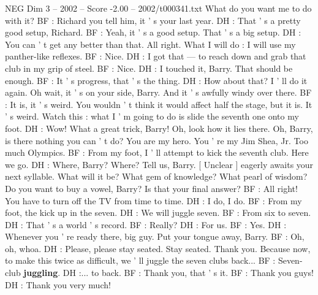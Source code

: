 \begin{textsample}{NEG Dim 3 – 2002 – Score -2.00 – 2002/t000341.txt}
What do you want me to do with it?
BF : Richard you tell him, it ' s your last year.
DH : That ' s a pretty good setup, Richard.
BF : Yeah, it ' s a good setup.
That ' s a big setup.
DH : You can ' t get any better than that.
All right.
What I will do : I will use my panther-like reflexes.
BF : Nice.
DH : I got that — to reach down and grab that club in my grip of steel.
BF : Nice.
DH : I touched it, Barry.
That should be enough.
BF : It ' s progress, that ' s the thing.
DH : How about that?
I ' ll do it again.
Oh wait, it ' s on your side, Barry.
And it ' s awfully windy over there.
BF : It is, it ' s weird.
You wouldn ' t think it would affect half the stage, but it is.
It ' s weird.
Watch this : what I ' m going to do is slide the seventh one onto my foot.
DH : Wow!
What a great trick, Barry!
Oh, look how it lies there.
Oh, Barry, is there nothing you can ' t do?
You are my hero.
You ' re my Jim Shea, Jr.
Too much Olympics.
BF : From my foot, I ' ll attempt to kick the seventh club.
Here we go.
DH : Where, Barry?
Where?
Tell us, Barry. [ Unclear ] eagerly awaits your next syllable.
What will it be?
What gem of knowledge?
What pearl of wisdom?
Do you want to buy a vowel, Barry?
Is that your final answer?
BF : All right!
You have to turn off the TV from time to time.
DH : I do, I do.
BF : From my foot, the kick up in the seven.
DH : We will juggle seven.
BF : From six to seven.
DH : That ' s a world ' s record.
BF : Really?
DH : For us.
BF : Yes.
DH : Whenever you ' re ready there, big guy.
Put your tongue away, Barry.
BF : Oh, oh, whoa.
DH : Please, please stay seated.
Stay seated.
Thank you.
Because now, to make this twice as difficult, we ' ll juggle the seven clubs back...
BF : Seven-club \textbf{juggling}.
DH :... to back.
BF : Thank you, that ' s it.
BF : Thank you guys!
DH : Thank you very much!

\end{textsample}
